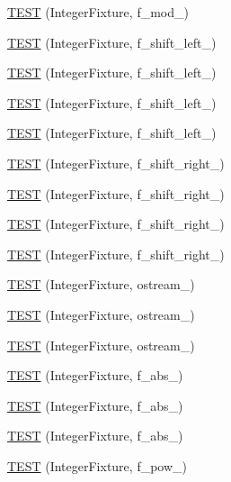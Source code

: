 \begin{DoxyCompactItemize}
\item 
\hyperlink{TestInteger_8c_09_09_a2f081f72e14ad18da7c454474170317f}{T\-E\-S\-T} (Integer\-Fixture, f\-\_\-mod\-\_)
\item 
\hyperlink{TestInteger_8c_09_09_aa052cd6237ecf6964967964627528bd0}{T\-E\-S\-T} (Integer\-Fixture, f\-\_\-shift\-\_\-left\-\_)
\item 
\hyperlink{TestInteger_8c_09_09_a367f89a2b04f6330cb926ce8158e7012}{T\-E\-S\-T} (Integer\-Fixture, f\-\_\-shift\-\_\-left\-\_)
\item 
\hyperlink{TestInteger_8c_09_09_a8d8e79d0117bd953579c92dc4575e062}{T\-E\-S\-T} (Integer\-Fixture, f\-\_\-shift\-\_\-left\-\_)
\item 
\hyperlink{TestInteger_8c_09_09_a1be4ee5c96dd6244f4d213d69583e846}{T\-E\-S\-T} (Integer\-Fixture, f\-\_\-shift\-\_\-left\-\_)
\item 
\hyperlink{TestInteger_8c_09_09_ae35f463426567b32b2d638d7bd48f598}{T\-E\-S\-T} (Integer\-Fixture, f\-\_\-shift\-\_\-right\-\_)
\item 
\hyperlink{TestInteger_8c_09_09_a85bdb1e53706fabdbd4f677958b352ee}{T\-E\-S\-T} (Integer\-Fixture, f\-\_\-shift\-\_\-right\-\_)
\item 
\hyperlink{TestInteger_8c_09_09_aaf48367e377dd846e9f40d7aa61f4f02}{T\-E\-S\-T} (Integer\-Fixture, f\-\_\-shift\-\_\-right\-\_)
\item 
\hyperlink{TestInteger_8c_09_09_a902d7908363cdab999bcb962fb466dbc}{T\-E\-S\-T} (Integer\-Fixture, f\-\_\-shift\-\_\-right\-\_)
\item 
\hyperlink{TestInteger_8c_09_09_ac978f2e9212e14974ab225fc44630050}{T\-E\-S\-T} (Integer\-Fixture, ostream\-\_)
\item 
\hyperlink{TestInteger_8c_09_09_a428babe6d9f982de9b44007179a973c7}{T\-E\-S\-T} (Integer\-Fixture, ostream\-\_)
\item 
\hyperlink{TestInteger_8c_09_09_ab4569a08d3ad92ce7381311c557a513f}{T\-E\-S\-T} (Integer\-Fixture, ostream\-\_)
\item 
\hyperlink{TestInteger_8c_09_09_a8156355c6d2c1293d20fdfebbcbd9c75}{T\-E\-S\-T} (Integer\-Fixture, f\-\_\-abs\-\_)
\item 
\hyperlink{TestInteger_8c_09_09_a538cf11f9c670fe61c6e4fa2d0f20d93}{T\-E\-S\-T} (Integer\-Fixture, f\-\_\-abs\-\_)
\item 
\hyperlink{TestInteger_8c_09_09_ab84c8e5de8347615c4489eb3f726e291}{T\-E\-S\-T} (Integer\-Fixture, f\-\_\-abs\-\_)
\item 
\hyperlink{TestInteger_8c_09_09_a6959b6312987905f66f14d3964750f46}{T\-E\-S\-T} (Integer\-Fixture, f\-\_\-pow\-\_)

\end{DoxyCompactItemize}
